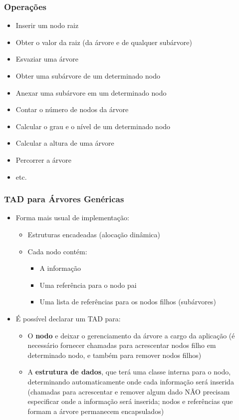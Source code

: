 \documentclass[aspectratio=169]{beamer}
\begin{document}
\begin{frame}\frametitle{Operações}
\begin{itemize}
	\item Inserir um nodo raiz
	\item Obter o valor da raiz (da árvore e de qualquer subárvore)
	\item Esvaziar uma árvore
	\item Obter uma subárvore de um determinado nodo
	\item Anexar uma subárvore em um determinado nodo
	\item Contar o número de nodos da árvore
	\item Calcular o grau e o nível de um determinado nodo
	\item Calcular a altura de uma árvore
	\item Percorrer a árvore
	\item etc.
\end{itemize}
\end{frame}

\begin{frame}\frametitle{TAD para Árvores Genéricas}
\begin{itemize}
	\item Forma mais usual de implementação:
	\begin{itemize}
		\item Estruturas encadeadas (alocação dinâmica)
		\item Cada nodo contém:
		\begin{itemize}
			\item A informação
			\item Uma referência para o nodo pai
			\item Uma lista de referências para os nodos filhos (subárvores)
		\end{itemize}
	\end{itemize}
	\item É possível declarar um TAD para:
	\begin{itemize}
		\item O \textbf{nodo} e deixar o gerenciamento da árvore a cargo da aplicação (é necessário fornecer chamadas para acrescentar nodos filho em determinado nodo, e também para remover nodos filhos)
		\item A \textbf{estrutura de dados}, que terá uma classe interna para o nodo, determinando automaticamente onde cada informação será inserida (chamadas para acrescentar e remover algum dado NÃO precisam especificar onde a informação será inserida; nodos e referências que formam a árvore permanecem encapsulados)
	\end{itemize}
\end{itemize}
\end{frame}
\end{document}
